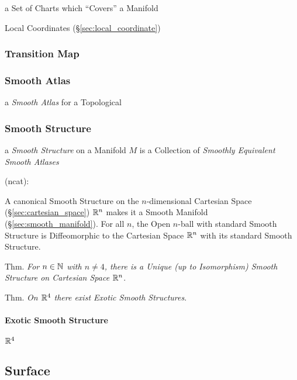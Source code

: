 a Set of Charts which ``Covers'' a Manifold

\fist Local Coordinates (\S\ref{sec:local_coordinate})



\subsubsection{Transition Map}\label{sec:transition_map}

\subsubsection{Smooth Atlas}\label{sec:smooth_atlas}

a \emph{Smooth Atlas} for a Topological



\subsubsection{Smooth Structure}\label{sec:smooth_structure}

a \emph{Smooth Structure} on a Manifold $M$ is a Collection of \emph{Smoothly
  Equivalent Smooth Atlases}

(ncat):

A canonical Smooth Structure on the $n$-dimensional Cartesian Space
(\S\ref{sec:cartesian_space}) $\mathbb{R}^n$ makes it a Smooth Manifold
(\S\ref{sec:smooth_manifold}). For all $n$, the Open $n$-ball with standard
Smooth Structure is Diffeomorphic to the Cartesian Space $\mathbb{R}^n$ with its
standard Smooth Structure.

Thm. \emph{For $n \in \mathbb{N}$ with $n \neq 4$, there is a Unique (up to
  Isomorphism) Smooth Structure on Cartesian Space $\mathbb{R}^n$}.

Thm. \emph{On $\mathbb{R}^4$ there exist Exotic Smooth Structures}.



\paragraph{Exotic Smooth Structure}\label{sec:smooth_structure}

$\mathbb{R}^4$



\subsection{Surface}\label{sec:surface}

